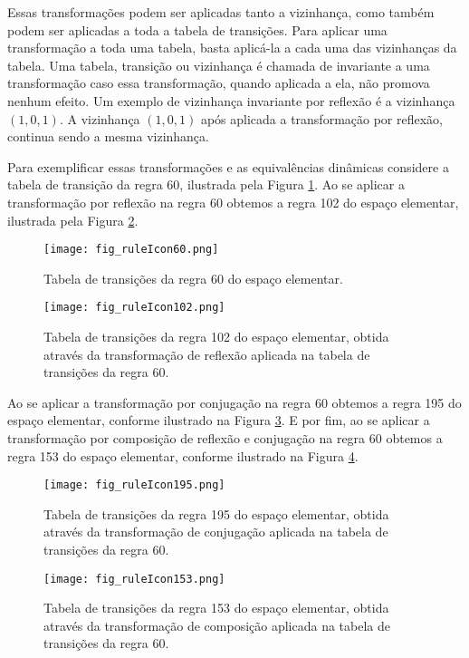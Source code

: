 Essas transformações podem ser aplicadas tanto a vizinhança, como também podem ser aplicadas a toda a tabela de transições. Para aplicar uma transformação a toda uma tabela, basta aplicá-la a cada uma das vizinhanças da tabela. Uma tabela, transição ou vizinhança é chamada de invariante a uma transformação caso essa transformação, quando aplicada a ela, não promova nenhum efeito. Um exemplo de vizinhança invariante por reflexão é a vizinhança $(1,0,1)$. A vizinhança $(1,0,1)$ após aplicada a transformação por reflexão, continua sendo a mesma vizinhança.

Para exemplificar essas transformações e as equivalências dinâmicas considere a tabela de transição da regra 60, ilustrada pela Figura \ref{fig:table60}. Ao se aplicar a transformação por reflexão na regra 60 obtemos a regra 102 do espaço elementar, ilustrada pela Figura \ref{fig:table102}.

	\begin{figure}[h!]
	  \centering
	  \texttt{[image: fig\_ruleIcon60.png]}
	  \caption{Tabela de transições da regra 60 do espaço elementar.}
	  \label{fig:table60}
	\end{figure}

	\begin{figure}[h!]
	  \centering
	  \texttt{[image: fig\_ruleIcon102.png]}
	  \caption{Tabela de transições da regra 102 do espaço elementar, obtida através da transformação de reflexão aplicada na tabela de transições da regra 60.}
	  \label{fig:table102}
	\end{figure}

Ao se aplicar a transformação por conjugação na regra 60 obtemos a regra 195 do espaço elementar, conforme ilustrado na Figura \ref{fig:table195}. E por fim, ao se aplicar a transformação por composição de reflexão e conjugação na regra 60 obtemos a regra 153 do espaço elementar, conforme ilustrado na Figura \ref{fig:table153}.

	\begin{figure}[h!]
	  \centering
	  \texttt{[image: fig\_ruleIcon195.png]}
	  \caption{Tabela de transições da regra 195 do espaço elementar, obtida através da transformação de conjugação aplicada na tabela de transições da regra 60.}
	  \label{fig:table195}
	\end{figure}

	\begin{figure}[h!]
	  \centering
	  \texttt{[image: fig\_ruleIcon153.png]}
	  \caption{Tabela de transições da regra 153 do espaço elementar, obtida através da transformação de composição aplicada na tabela de transições da regra 60.}
	  \label{fig:table153}
	\end{figure}

